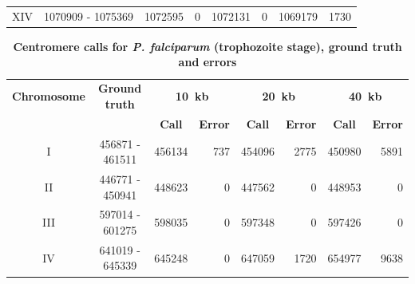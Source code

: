 \begin{table}[ht!]
\begin{center}
\begin{tabular}{c | c  r  r  r  r r r}
XIV & \num[group-separator={\,}]{1070909} - \num[group-separator={\,}]{1075369} & \num[group-separator={\,}]{1072595} & \small{\num[group-separator={\,}]{0}}  & \num[group-separator={\,}]{1072131} & \small{\num[group-separator={\,}]{0}}  & \num[group-separator={\,}]{1069179} & \small{\num[group-separator={\,}]{1730}}  \\
\end{tabular}
\end{center}
\label{supptable:rings_results}
\end{table}


\begin{table}[ht!]
\caption{\textbf{Centromere calls for \textit{P. falciparum} (trophozoite stage),
ground truth and errors}}
\vspace{10pt}
\begin{center}
\begin{tabular}{c | c  r  r  r  r r r}
\textbf{Chromosome}  & \textbf{Ground truth} & \multicolumn{2}{c}{\textbf{10~kb}} & \multicolumn{2}{c}{\textbf{20~kb}} & \multicolumn{2}{c}{\textbf{40~kb}} \\
  &   &  \multicolumn{1}{c}{\textbf{Call}} &  \multicolumn{1}{c}{\textbf{Error}} &  \multicolumn{1}{c}{\textbf{Call}} &  \multicolumn{1}{c}{\textbf{Error}} &  \multicolumn{1}{c}{\textbf{Call}} &  \multicolumn{1}{c}{\textbf{Error}} \\
\hline
I & \num[group-separator={\,}]{456871} - \num[group-separator={\,}]{461511} & \num[group-separator={\,}]{456134} & \small{\num[group-separator={\,}]{737}}  & \num[group-separator={\,}]{454096} & \small{\num[group-separator={\,}]{2775}}  & \num[group-separator={\,}]{450980} & \small{\num[group-separator={\,}]{5891}}  \\
II & \num[group-separator={\,}]{446771} - \num[group-separator={\,}]{450941} & \num[group-separator={\,}]{448623} & \small{\num[group-separator={\,}]{0}}  & \num[group-separator={\,}]{447562} & \small{\num[group-separator={\,}]{0}}  & \num[group-separator={\,}]{448953} & \small{\num[group-separator={\,}]{0}}  \\
III & \num[group-separator={\,}]{597014} - \num[group-separator={\,}]{601275} & \num[group-separator={\,}]{598035} & \small{\num[group-separator={\,}]{0}}  & \num[group-separator={\,}]{597348} & \small{\num[group-separator={\,}]{0}}  & \num[group-separator={\,}]{597426} & \small{\num[group-separator={\,}]{0}}  \\
IV & \num[group-separator={\,}]{641019} - \num[group-separator={\,}]{645339} & \num[group-separator={\,}]{645248} & \small{\num[group-separator={\,}]{0}}  & \num[group-separator={\,}]{647059} & \small{\num[group-separator={\,}]{1720}}  & \num[group-separator={\,}]{654977} & \small{\num[group-separator={\,}]{9638}}  \\

\end{tabular}
\end{center}
\end{table}
